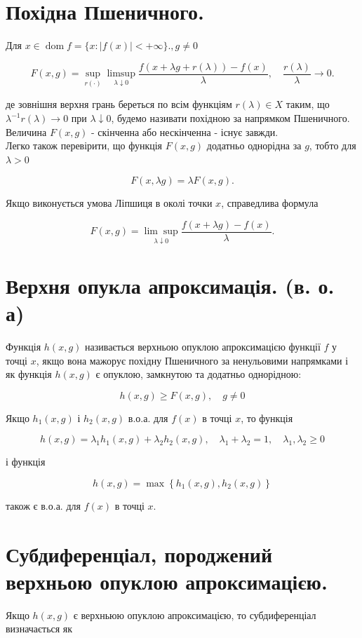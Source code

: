 \documentclass[10pt]{article}
\begin{document}
\section*{Похідна Пшеничного.}
Для $x \in \operatorname{dom} f=\{x:|f(x)|<+\infty\} ., g \neq 0$

$$
F(x, g)=\sup _{r(\cdot)} \limsup _{\lambda \downarrow 0} \frac{f(x+\lambda g+r(\lambda))-f(x)}{\lambda}, \quad \frac{r(\lambda)}{\lambda} \rightarrow 0 .
$$

де зовнішня верхня грань береться по всім функціям $r(\lambda) \in X$ таким, що $\lambda^{-1} r(\lambda) \rightarrow 0$ при $\lambda \downarrow 0$, будемо називати похідною за напрямком Пшеничного. Величина $F(x, g)$ - скінченна або нескінченна - існує завжди.\\
Легко також перевірити, що функція $F(x, g)$ додатньо однорідна за $g$, тобто для $\lambda>0$

$$
F(x, \lambda g)=\lambda F(x, g) .
$$

Якщо виконується умова Ліпшиця в околі точки $x$, справедлива формула

$$
F(x, g)=\underset{\lambda \downarrow 0}{\lim \sup } \frac{f(x+\lambda g)-f(x)}{\lambda} .
$$

\section*{Верхня опукла апроксимація. (в. о. а)}
Функція $h(x, g)$ називається верхньою опуклою апроксимацією функції $f$ у точці $x$, якщо вона мажорує похідну Пшеничного за ненульовими напрямками і як функція $h(x, g)$ є опуклою, замкнутою та додатньо однорідною:

$$
h(x, g) \geq F(x, g), \quad g \neq 0
$$

Якщо $h_{1}(x, g)$ і $h_{2}(x, g)$ в.о.а. для $f(x)$ в точці $x$, то функція

$$
h(x, g)=\lambda_{1} h_{1}(x, g)+\lambda_{2} h_{2}(x, g), \quad \lambda_{1}+\lambda_{2}=1, \quad \lambda_{1}, \lambda_{2} \geq 0
$$

і функція

$$
h(x, g)=\max \left\{h_{1}(x, g), h_{2}(x, g)\right\}
$$

також є в.о.а. для $f(x)$ в точці $x$.

\section*{Субдиференціал, породжений верхньою опуклою апроксимацією.}
Якщо $h(x, g)$ є верхньюю опуклою апроксимацією, то субдиференціал визначається як
\end{document}
